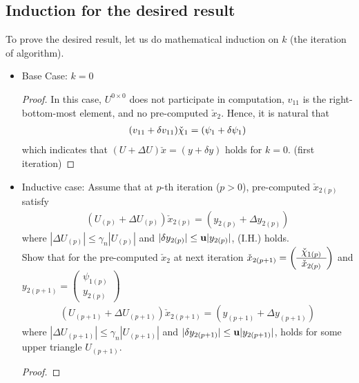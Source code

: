 \documentclass[11pt,a4paper]{article}
\begin{document}
\subsection{Induction for the desired result}
To prove the desired result, let us do mathematical induction on $k$ (the
iteration of algorithm).
\begin{itemize}
    \item Base Case: $k = 0$
        \begin{proof}
        In this case, $U^{0\times 0}$ does not participate in
        computation, $v_{11}$ is the right-bottom-most element, and no
        pre-computed $\check{x}_2$. Hence, it is natural that
        \begin{align}
            (v_{11} + \delta v_{11}) \check{\chi}_1 = (\psi_1+\delta\psi_1)
        \end{align}
        which indicates that $(U + \Delta U) \check{x} = (y + \delta y)$ holds
        for $k=0$. (first iteration)
    \end{proof}
\item Inductive case: Assume that at $p$-th iteration ($p > 0$), pre-computed $\check{x}_{2(p)}$ satisfy
        \begin{align}
            (U_{(p)} + \Delta U_{(p)}) \check{x}_{2(p)} = (y_{2(p)} + \Delta y_{2(p)})
        \end{align}
        where $|\Delta U_{(p)} | \leq \gamma_n |U_{(p)}|$ 
        and $|\delta y_{2(p)}| \leq \mathbf{u} |y_{2(p)}|$,
        (I.H.) holds. \\
        Show that for the pre-computed $\check{x}_2$ at next iteration
        $\check{x}_{2(p+1)} = \left( \begin{array}{c} \check{\chi}_{1(p)} \\\hline
                \check{x}_{2(p)}  \end{array} \right)$ 
         and 
        $y_{2(p+1)} = \left( \begin{array}{c} \psi_{1(p)} \\\hline
                y_{2(p)}  \end{array} \right)$ 
        \begin{align}
            (U_{(p+1)} + \Delta U_{(p+1)}) \check{x}_{2(p+1)} = (y_{(p+1)} + \Delta y_{(p+1)})
            \label{pp1conclusion}
        \end{align}
        where $|\Delta U_{(p+1)} | \leq \gamma_n |U_{(p+1)}|$ 
        and $|\delta y_{2(p+1)}| \leq \mathbf{u} |y_{2(p+1)}|$,
        holds for some upper triangle $U_{(p+1)}$.
        \begin{proof}

\end{proof}
\end{itemize}
\end{document}
